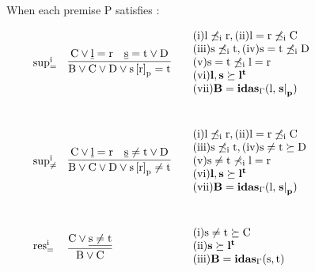 \begin{figure}
When each premise P satisfies :

\[
\begin{array}{llll}

	\vspace{1cm}
	
	\m{sup^i_{=}} &
	\vcenter{
		\infer[]
		{\m{B \lor C \lor D \lor \termRepAt{s}{r}{p}=t}}
		{
			\m{C \lor \underline{l}=r } 
				&
			\m{\underline{s} = t \lor D}
		}
	}&
			\begin{array}{ll}
				\m{\sci{1} l \not\preceq_i r, \sci{2} l=r \not\preceq_i C}\\
				\m{\sci{3} s \not\preceq_i t, \sci{4} s=t \not\preceq_i D}\\
				\m{\sci{5} s=t \not\preceq_i l=r}\\
				\m{\sci{6} \mathbf{l,s \succeq l^t}}\\
				\m{\sci{7} \mathbf{B = \idasg{l}{\termAt{\mathbf{s}}{\mathbf{p}}}}}
			\end{array}\\	
	
	\vspace{1cm}
	
	
	\m{sup^i_{\neq}}&
	\vcenter{
		\infer[]
		{\m{B \lor C \lor D \lor \termRepAt{s}{r}{p}\neq t}}
		{
			\m{C \lor \underline{l}=r} 
				&
			\m{\underline{s} \neq t \lor D}
		}
	} &

			\begin{array}{ll}
				\m{\sci{1} l \not\preceq_i r, \sci{2} l=r \not\preceq_i C}\\
				\m{\sci{3} s \not\preceq_i t, \sci{4} s\neq t \succeq D}\\
				\m{\sci{5} s \neq t \not\prec_i l=r}\\
				\m{\sci{6} \mathbf{l,s \succeq l^t}}\\
				\m{\sci{7} \mathbf{B = \idasg{l}{\termAt{\mathbf{s}}{\mathbf{p}}}}}
			\end{array}	\\
	
	\vspace{1cm}

	\m{res^i_{=}}&
	\vcenter{
		\infer[]
		{\m{B \lor C}}
		{
			\m{C \lor \underline{s \neq t}}
		}
	} &

			\begin{array}{ll}
				\m{\sci{1} s \neq t \succeq C}\\
				\m{\sci{2} \mathbf{s \succeq l^t}}\\
				\m{\sci{3} \mathbf{B = \idasg{s}{t}}}
			\end{array}
		\\


\end{array}\]
\end{figure}
